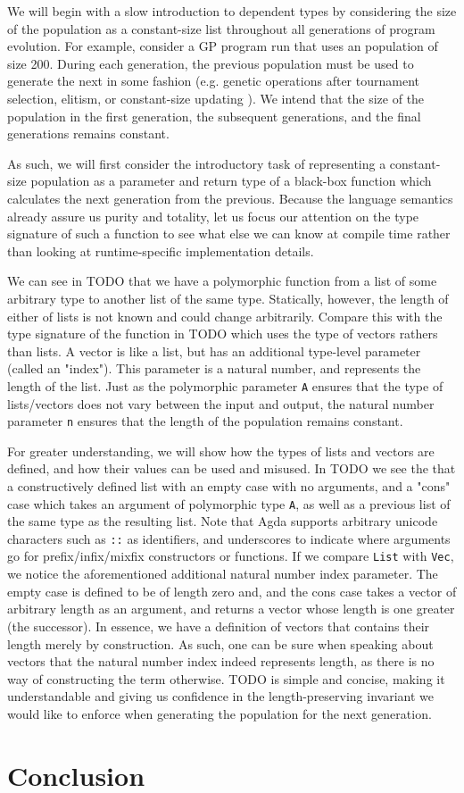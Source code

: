 \documentclass{acm_proc_article-sp}
\begin{document}
We will begin with a slow introduction to dependent types by
considering the size of the population as a constant-size list
throughout all generations of program evolution. For example, consider
a GP program run that uses an population of size 200. During each
generation, the previous population must be used to generate the next
in some fashion (e.g. genetic operations after tournament selection,
elitism, or constant-size updating \cite{montana:strongtree}). We
intend that the size of the population in the first generation, the
subsequent generations, and the final generations remains
constant.

As such, we will first consider the introductory task of representing
a constant-size population as a parameter and return type of a
black-box function which calculates the next generation from the
previous. Because the language semantics already assure us purity and
totality, let us focus our attention on the type signature of such a
function to see what else we can know at compile time rather than
looking at runtime-specific implementation details.


We can see in TODO
that we have a polymorphic function from a list of some arbitrary type
to another list of the same type. Statically, however, the length of
either of lists is not known and could change arbitrarily. Compare
this with the type signature of the function in TODO which uses the
type of vectors rathers than lists. A vector is like a list, but has
an additional type-level parameter (called an "index"). This parameter
is a natural number, and represents the length of the list. Just as
the polymorphic parameter \texttt{A} ensures that the type of lists/vectors
does not vary between the input and output, the natural number
parameter \texttt{n} ensures that the length of the population remains
constant.

For greater understanding, we will show how the types of lists and
vectors are defined, and how their values can be used and misused. In
TODO we see the that a constructively defined list with an empty case
with no arguments, and a "cons" case which takes an argument of
polymorphic type \texttt{A}, as well as a previous list of the same
type as the resulting list. Note that Agda supports arbitrary unicode
characters such as \texttt{::} as identifiers, and underscores to
indicate where arguments go for prefix/infix/mixfix constructors or
functions. If we compare \texttt{List} with \texttt{Vec}, we notice
the aforementioned additional natural number index parameter. The
empty case is defined to be of length zero and, and the cons case
takes a vector of arbitrary length as an argument, and returns a
vector whose length is one greater (the successor). In essence, we
have a definition of vectors that contains their length merely by
construction. As such, one can be sure when speaking about vectors
that the natural number index indeed represents length, as there is no
way of constructing the term otherwise. TODO is simple and concise,
making it understandable and giving us confidence in the
length-preserving invariant we would like to enforce when generating
the population for the next generation.


\section{Conclusion}




\end{document}
